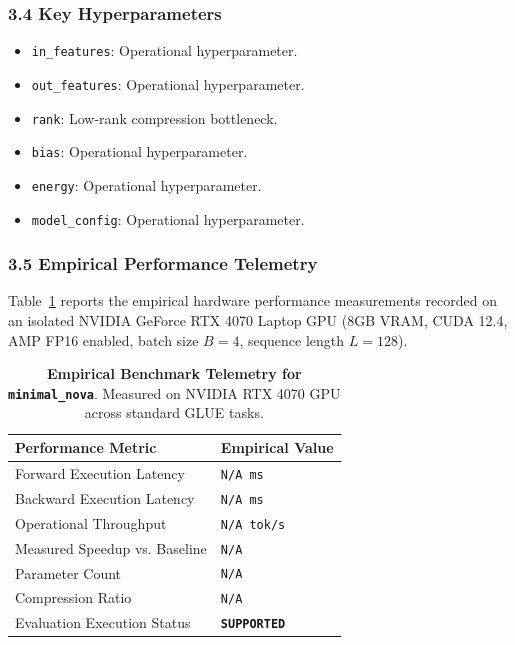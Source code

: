 \subsubsection*{3.4 Key Hyperparameters}
\begin{itemize}
    \item \texttt{in\_features}: Operational hyperparameter.
    \item \texttt{out\_features}: Operational hyperparameter.
    \item \texttt{rank}: Low-rank compression bottleneck.
    \item \texttt{bias}: Operational hyperparameter.
    \item \texttt{energy}: Operational hyperparameter.
    \item \texttt{model\_config}: Operational hyperparameter.
\end{itemize}

\subsubsection*{3.5 Empirical Performance Telemetry}
Table~\ref{tab:telemetry_minimal\_nova} reports the empirical hardware performance measurements recorded on an isolated NVIDIA GeForce RTX 4070 Laptop GPU (8GB VRAM, CUDA 12.4, AMP FP16 enabled, batch size $B=4$, sequence length $L=128$).

\begin{table}[h]
\centering
\small
\caption{\textbf{Empirical Benchmark Telemetry for \texttt{minimal\_nova}}. Measured on NVIDIA RTX 4070 GPU across standard GLUE tasks.}
\label{tab:telemetry_minimal\_nova}
\begin{tabularx}{\columnwidth}{lX}
\toprule
\textbf{Performance Metric} & \textbf{Empirical Value} \\
\midrule
Forward Execution Latency & \texttt{N/A ms} \\
Backward Execution Latency & \texttt{N/A ms} \\
Operational Throughput & \texttt{N/A tok/s} \\
Measured Speedup vs. Baseline & \texttt{N/A} \\
Parameter Count & \texttt{N/A} \\
Compression Ratio & \texttt{N/A} \\
Evaluation Execution Status & \textbf{\texttt{SUPPORTED}} \\
\bottomrule
\end{tabularx}
\end{table}

